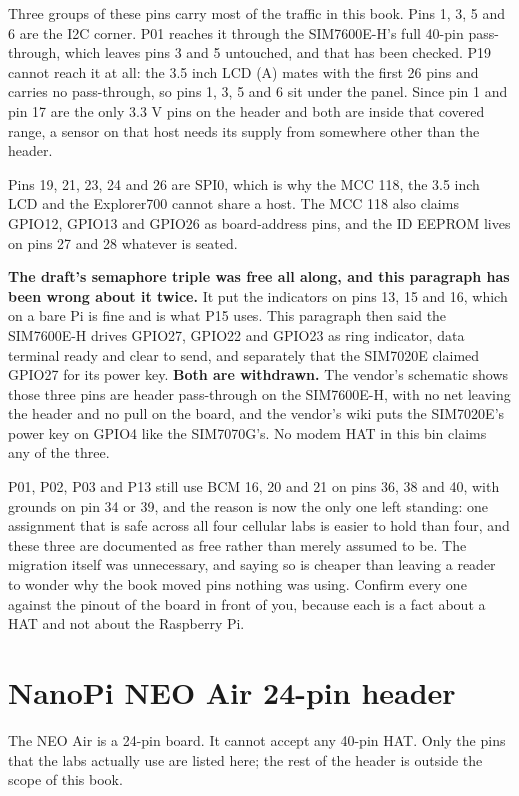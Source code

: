 Three groups of these pins carry most of the traffic in this book. Pins 1, 3, 5 and 6 are the I2C corner. P01 reaches it through the SIM7600E-H's full 40-pin pass-through, which leaves pins 3 and 5 untouched, and that has been checked. P19 cannot reach it at all: the 3.5 inch LCD (A) mates with the first 26 pins and carries no pass-through, so pins 1, 3, 5 and 6 sit under the panel. Since pin 1 and pin 17 are the only 3.3 V pins on the header and both are inside that covered range, a sensor on that host needs its supply from somewhere other than the header.

Pins 19, 21, 23, 24 and 26 are SPI0, which is why the MCC 118, the 3.5 inch LCD and the Explorer700 cannot share a host. The MCC 118 also claims GPIO12, GPIO13 and GPIO26 as board-address pins, and the ID EEPROM lives on pins 27 and 28 whatever is seated.

\textbf{The draft's semaphore triple was free all along, and this paragraph has been wrong about it twice.} It put the indicators on pins 13, 15 and 16, which on a bare Pi is fine and is what P15 uses. This paragraph then said the SIM7600E-H drives GPIO27, GPIO22 and GPIO23 as ring indicator, data terminal ready and clear to send, and separately that the SIM7020E claimed GPIO27 for its power key. \textbf{Both are withdrawn.} The vendor's schematic shows those three pins are header pass-through on the SIM7600E-H, with no net leaving the header and no pull on the board, and the vendor's wiki puts the SIM7020E's power key on GPIO4 like the SIM7070G's. No modem HAT in this bin claims any of the three.

P01, P02, P03 and P13 still use BCM 16, 20 and 21 on pins 36, 38 and 40, with grounds on pin 34 or 39, and the reason is now the only one left standing: one assignment that is safe across all four cellular labs is easier to hold than four, and these three are documented as free rather than merely assumed to be. The migration itself was unnecessary, and saying so is cheaper than leaving a reader to wonder why the book moved pins nothing was using. Confirm every one against the pinout of the board in front of you, because each is a fact about a HAT and not about the Raspberry Pi.

\section{NanoPi NEO Air 24-pin header}

The NEO Air is a 24-pin board. It cannot accept any 40-pin HAT. Only the pins that the labs actually use are listed here; the rest of the header is outside the scope of this book.

